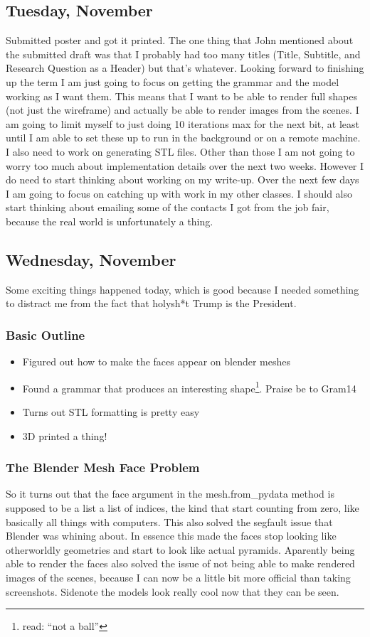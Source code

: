 \documentclass[letterpaper,oneside,titlepage]{article}
\begin{document}
\subsection{Tuesday, November }
Submitted poster and got it printed.  The one thing that John mentioned about the submitted draft was that I probably had too many titles (Title, Subtitle, and Research Question as a Header) but that's whatever.  Looking forward to finishing up the term I am just going to focus on getting the grammar and the model working as I want them.  This means that I want to be able to render full shapes (not just the wireframe) and actually be able to render images from the scenes.  I am going to limit myself to just doing 10 iterations max for the next bit, at least until I am able to set these up to run in the background or on a remote machine.  I also need to work on generating STL files.  Other than those I am not going to worry too much about implementation details over the next two weeks.  However I do need to start thinking about working on my write-up.  Over the next few days I am going to focus on catching up with work in my other classes.  I should also start thinking about emailing some of the contacts I got from the job fair, because the real world is unfortunately a thing.


\subsection{Wednesday, November }
Some exciting things happened today, which is good because I needed something to distract me from the fact that holysh*t Trump is the President.

\subsubsection{Basic Outline}
\begin{itemize}
\item Figured out how to make the faces appear on blender meshes
\item Found a grammar that produces an interesting shape\footnote{read: ``not a ball''}.  Praise be to Gram14
\item Turns out STL formatting is pretty easy
\item 3D printed a thing!
\end{itemize}

\subsubsection{The Blender Mesh Face Problem}
So it turns out that the face argument in the mesh.from\_pydata method is supposed to be a list a list of indices, the kind that start counting from zero, like basically all things with computers.  This also solved the segfault issue that Blender was whining about.  In essence this made the faces stop looking like otherworldly geometries and start to look like actual pyramids.  Aparently being able to render the faces also solved the issue of not being able to make rendered images of the scenes, because I can now be a little bit more official than taking screenshots.  Sidenote the models look really cool now that they can be seen.
\end{document}

